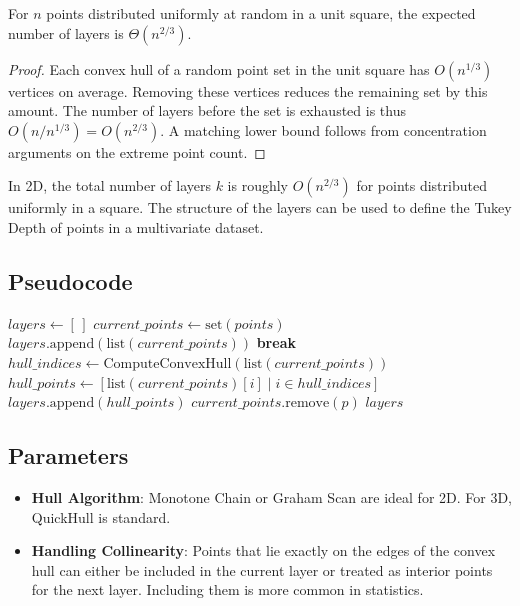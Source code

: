 \begin{theorem}\label{thm:layer_count}
For $n$ points distributed uniformly at random in a unit square, the expected number of layers is $\Theta(n^{2/3})$.
\end{theorem}
\begin{proof}
Each convex hull of a random point set in the unit square has $O(n^{1/3})$ vertices on average. Removing these vertices reduces the remaining set by this amount. The number of layers before the set is exhausted is thus $O(n / n^{1/3}) = O(n^{2/3})$. A matching lower bound follows from concentration arguments on the extreme point count.
\end{proof}

In 2D, the total number of layers $k$ is roughly $O(n^{2/3})$ for points distributed uniformly in a square. The structure of the layers can be used to define the Tukey Depth of points in a multivariate dataset.



\subsection{Pseudocode}

\begin{algorithm}[htbp]
\caption{Convex Hull Peeling (Onion Peeling)}
\label{alg:onion_peeling}
\begin{algorithmic}[1]
  \State $layers \gets [\,]$
  \State $current\_points \gets \text{set}(points)$
      \State $layers.\text{append}(\text{list}(current\_points))$
      \State \textbf{break}
    \EndIf
    \State $hull\_indices \gets \text{ComputeConvexHull}(\text{list}(current\_points))$
    \State $hull\_points \gets [\text{list}(current\_points)[i] \mid i \in hull\_indices]$
    \State $layers.\text{append}(hull\_points)$
      \State $current\_points.\text{remove}(p)$
    \EndFor
  \EndWhile
  \State \Return $layers$
\EndFunction
\end{algorithmic}
\end{algorithm}

\subsection{Parameters}

\begin{itemize}
\item \textbf{Hull Algorithm}: Monotone Chain or Graham Scan are ideal for 2D. For 3D, QuickHull is standard.
\item \textbf{Handling Collinearity}: Points that lie exactly on the edges of the convex hull can either be included in the current layer or treated as interior points for the next layer. Including them is more common in statistics.
\end{itemize}

